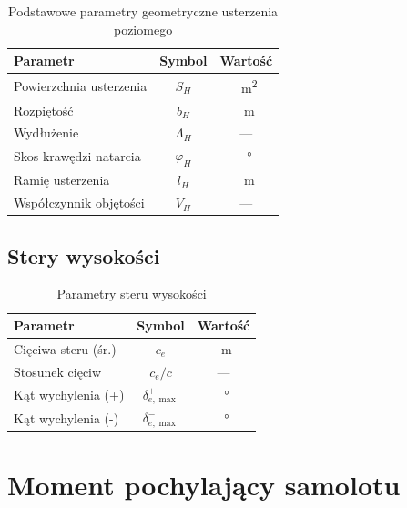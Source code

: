 \documentclass[12pt, a4paper]{article}
\begin{document}
\begin{table}[H]
  \centering
  \caption{Podstawowe parametry geometryczne usterzenia poziomego}
  \label{tab:geom_poziome}
  \begin{tabular}{lcc}
    \toprule
    \textbf{Parametr} & \textbf{Symbol} & \textbf{Wartość} \\
    \midrule
    Powierzchnia usterzenia & $S_H$          & \SI{}{m^2}      \\
    Rozpiętość              & $b_H$          & \SI{}{m}        \\
    Wydłużenie              & $\Lambda_H$    & ---             \\
    Skos krawędzi natarcia  & $\varphi_{H}$  & \SI{}{\degree}  \\
    Ramię usterzenia        & $l_H$          & \SI{}{m}        \\
    Współczynnik objętości  & $V_H$          & ---             \\
    \bottomrule
  \end{tabular}
\end{table}

\subsection{Stery wysokości}

\begin{table}[H]
  \centering
  \caption{Parametry steru wysokości}
  \label{tab:ster}
  \begin{tabular}{lcc}
    \toprule
    \textbf{Parametr} & \textbf{Symbol} & \textbf{Wartość} \\
    \midrule
    Cięciwa steru (śr.) & $c_e$   & \SI{}{m}  \\
    Stosunek cięciw     & $c_e/c$ & ---       \\
    Kąt wychylenia (+)  & $\delta_{e,\max}^+$ & \SI{}{\degree} \\
    Kąt wychylenia (-)  & $\delta_{e,\max}^-$ & \SI{}{\degree} \\
    \bottomrule
  \end{tabular}
\end{table}

\section{Moment pochylający samolotu}
\end{document}
